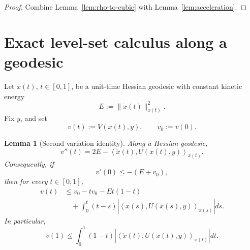 \documentclass[11pt]{article}
\newtheorem{lemma}{Lemma}
\newcommand{\ip}[2]{\left\langle #1,#2\right\rangle}
\begin{document}
\begin{proof}
Combine Lemma~\ref{lem:rho-to-cubic} with Lemma~\ref{lem:acceleration}.
\end{proof}

\section{Exact level-set calculus along a geodesic}

Let \(x(t)\), \(t\in[0,1]\), be a unit-time Hessian geodesic with constant kinetic energy
\[
    E:=\|\dot x(t)\|_{x(t)}^2.
\]
Fix \(y\), and set
\[
    v(t):=V(x(t),y),
    \qquad
    v_0:=v(0).
\]

\begin{lemma}[Second variation identity]\label{lem:second-variation}
Along a Hessian geodesic,
\[
    v''(t)=2E-\ip{\ddot x(t)}{U(x(t),y)}_{x(t)}.
\]
Consequently, if
\[
    v'(0)\le -(E+v_0),
\]
then for every \(t\in[0,1]\),
\[
\begin{aligned}
    v(t)
    &\le
    v_0-tv_0-Et(1-t) \\
    &\quad+
    \int_0^t(t-s)
    \left|
    \ip{\ddot x(s)}{U(x(s),y)}_{x(s)}
    \right|ds.
\end{aligned}
\]
In particular,
\[
    v(1)
    \le
    \int_0^1(1-t)
    \left|
    \ip{\ddot x(t)}{U(x(t),y)}_{x(t)}
    \right|dt.
\]
\end{lemma}
\end{document}
